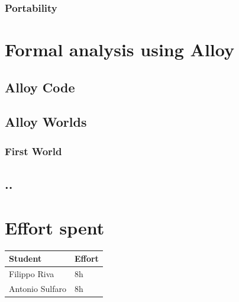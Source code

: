 \documentclass[11pt]{report}
\begin{document}
\subsection{Portability}


\chapter{Formal analysis using Alloy}

\section{Alloy Code}

\section{Alloy Worlds}
\subsection{First World}
\section{..}

\chapter{Effort spent}
\begin{table}[H]
\centering
\begin{tabular}{|l|l|}
\hline
\textbf{Student}       & \textbf{Effort} \\ \hline
Filippo Riva           & 8h             \\ \hline
Antonio Sulfaro        & 8h             \\ \hline
\end{tabular}
\end{table}
\end{document}
